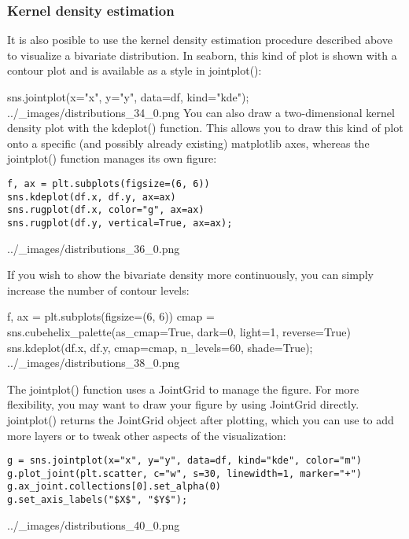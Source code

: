 \begin{frame}
\frametitle{Kernel density estimation}
It is also posible to use the kernel density estimation procedure described above to visualize a bivariate distribution. In seaborn, this kind of plot is shown with a contour plot and is available as a style in jointplot():

sns.jointplot(x="x", y="y", data=df, kind="kde");
../_images/distributions_34_0.png
You can also draw a two-dimensional kernel density plot with the kdeplot() function. This allows you to draw this kind of plot onto a specific (and possibly already existing) matplotlib axes, whereas the jointplot() function manages its own figure:
\end{frame}
\begin{frame}[fragile]
	\begin{verbatim}
f, ax = plt.subplots(figsize=(6, 6))
sns.kdeplot(df.x, df.y, ax=ax)
sns.rugplot(df.x, color="g", ax=ax)
sns.rugplot(df.y, vertical=True, ax=ax);
\end{verbatim}
../_images/distributions_36_0.png
\end{frame}
\begin{frame}
If you wish to show the bivariate density more continuously, you can simply increase the number of contour levels:

f, ax = plt.subplots(figsize=(6, 6))
cmap = sns.cubehelix_palette(as_cmap=True, dark=0, light=1, reverse=True)
sns.kdeplot(df.x, df.y, cmap=cmap, n_levels=60, shade=True);
../_images/distributions_38_0.png

\end{frame}
\begin{frame}[fragile]
The jointplot() function uses a JointGrid to manage the figure. For more flexibility, you may want to draw your figure by using JointGrid directly. jointplot() returns the JointGrid object after plotting, which you can use to add more layers or to tweak other aspects of the visualization:
\begin{verbatim}
g = sns.jointplot(x="x", y="y", data=df, kind="kde", color="m")
g.plot_joint(plt.scatter, c="w", s=30, linewidth=1, marker="+")
g.ax_joint.collections[0].set_alpha(0)
g.set_axis_labels("$X$", "$Y$");
\end{verbatim}
../_images/distributions_40_0.png

\end{frame}
